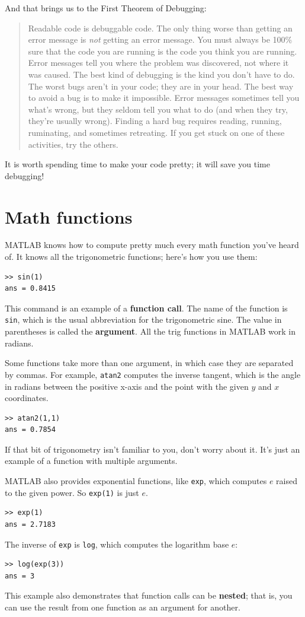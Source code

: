 \documentclass{book}
\newcommand{\displaythrm}[1]{%
    \ifthenelse{\equal{#1}{1}}%
        {Readable code is debuggable code.}{%
    \ifthenelse{\equal{#1}{2}}%
        {The only thing worse than getting an error message is {\em
         not} getting an error message.}{%
    \ifthenelse{\equal{#1}{3}}%
        {You must always be 100\% sure that the code you are running
         is the code you think you are running.}{%
    \ifthenelse{\equal{#1}{4}}%
        {Error messages tell you where the problem was discovered,
         not where it was caused.}{%
    \ifthenelse{\equal{#1}{5}}%
        {The best kind of debugging is the kind you don't have to do.}{%
    \ifthenelse{\equal{#1}{6}}%
        {The worst bugs aren't in your code; they are in your head.}{%
    \ifthenelse{\equal{#1}{7}}%
        {The best way to avoid a bug is to make it impossible.}{%
    \ifthenelse{\equal{#1}{8}}%
        {Error messages sometimes tell you what's wrong, but they
         seldom tell you what to do (and when they try, they're usually
         wrong).}{%
    \ifthenelse{\equal{#1}{9}}%
        {Finding a hard bug requires reading, running, ruminating,
         and sometimes retreating.  If you get stuck on one of these
         activities, try the others.}{%
    {}%
}}}}}}}}}}%
\begin{document}
And that brings us to the First Theorem of Debugging:

\begin{quote}
\displaythrm{1}
\end{quote}

It is worth spending time to make your code pretty; it will save
you time debugging!


\section{Math functions}

MATLAB knows how to compute pretty much every math function you've
heard of.  It knows all the trigonometric functions; here's how you
use them:

\begin{verbatim}
>> sin(1)
ans = 0.8415
\end{verbatim}

This command is an example of a {\bf function call}.  The name of the
function is {\tt sin}, which is the usual abbreviation for the
trigonometric sine.  The value in parentheses is called the {\bf argument}.
All the trig functions in MATLAB work in radians.

Some functions take more than one argument, in which case they are
separated by commas.  For example, {\tt atan2} computes the inverse
tangent, which is the angle in radians between the positive x-axis and
the point with the given $y$ and $x$ coordinates.

\begin{verbatim}
>> atan2(1,1)
ans = 0.7854
\end{verbatim}

If that bit of trigonometry isn't familiar to you, don't worry about
it.  It's just an example of a function with multiple arguments.

MATLAB also provides exponential functions, like {\tt exp}, which
computes $e$ raised to the given power.  So {\tt exp(1)} is just $e$.

\begin{verbatim}
>> exp(1)
ans = 2.7183
\end{verbatim}

The inverse of {\tt exp} is {\tt log}, which computes the logarithm
base $e$:

\begin{verbatim}
>> log(exp(3))
ans = 3
\end{verbatim}

This example also demonstrates that function calls can be {\bf nested};
that is, you can use the result from one function as an argument for
another.
\end{document}
